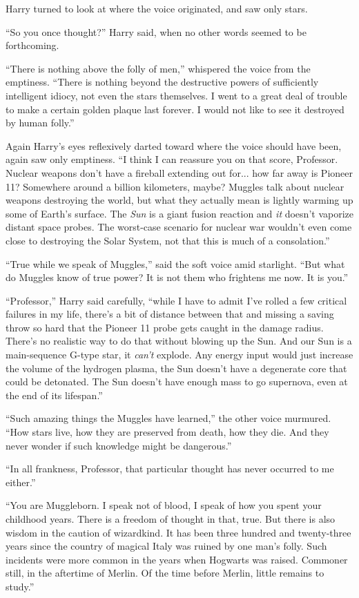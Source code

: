 Harry turned to look at where the voice originated, and saw only stars.

“So you once thought?” Harry said, when no other words seemed to be forthcoming.

“There is nothing above the folly of men,” whispered the voice from the emptiness. “There is nothing beyond the destructive powers of sufficiently intelligent idiocy, not even the stars themselves. I went to a great deal of trouble to make a certain golden plaque last forever. I would not like to see it destroyed by human folly.”

Again Harry’s eyes reflexively darted toward where the voice should have been, again saw only emptiness. “I think I can reassure you on that score, Professor. Nuclear weapons don’t have a fireball extending out for... how far away is Pioneer 11? Somewhere around a billion kilometers, maybe? Muggles talk about nuclear weapons destroying the world, but what they actually mean is lightly warming up some of Earth’s surface. The \emph{Sun} is a giant fusion reaction and \emph{it} doesn’t vaporize distant space probes. The worst-case scenario for nuclear war wouldn’t even come close to destroying the Solar System, not that this is much of a consolation.”

“True while we speak of Muggles,” said the soft voice amid starlight. “But what do Muggles know of true power? It is not them who frightens me now. It is you.”

“Professor,” Harry said carefully, “while I have to admit I’ve rolled a few critical failures in my life, there’s a bit of distance between that and missing a saving throw so hard that the Pioneer 11 probe gets caught in the damage radius. There’s no realistic way to do that without blowing up the Sun. And our Sun is a main-sequence G-type star, it \emph{can’t} explode. Any energy input would just increase the volume of the hydrogen plasma, the Sun doesn’t have a degenerate core that could be detonated. The Sun doesn’t have enough mass to go supernova, even at the end of its lifespan.”

“Such amazing things the Muggles have learned,” the other voice murmured. “How stars live, how they are preserved from death, how they die. And they never wonder if such knowledge might be dangerous.”

“In all frankness, Professor, that particular thought has never occurred to me either.”

“You are Muggleborn. I speak not of blood, I speak of how you spent your childhood years. There is a freedom of thought in that, true. But there is also wisdom in the caution of wizardkind. It has been three hundred and twenty-three years since the country of magical Italy was ruined by one man’s folly. Such incidents were more common in the years when Hogwarts was raised. Commoner still, in the aftertime of Merlin. Of the time before Merlin, little remains to study.”

